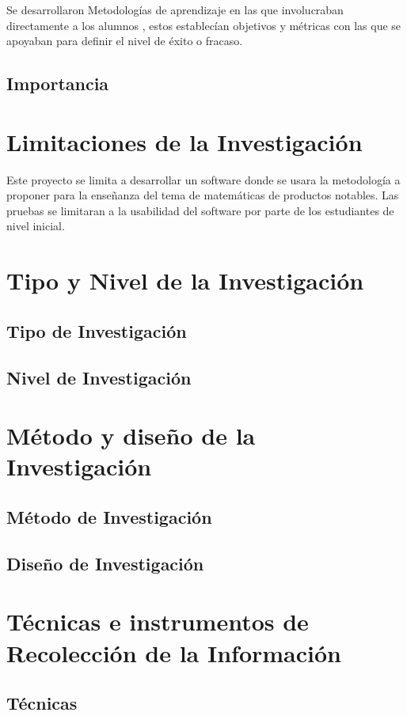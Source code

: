     Se desarrollaron Metodologías de aprendizaje en las que involucraban directamente a los alumnos \cite{Villagrasa2013}, estos establecían objetivos y métricas con las que se apoyaban para definir el nivel de éxito o fracaso.

    \subsection{Importancia}


\section{Limitaciones de la Investigación}
Este proyecto se limita a desarrollar un software donde se usara la metodología a proponer para la enseñanza del tema de matemáticas de productos notables. Las pruebas se limitaran a la usabilidad del software por parte de los estudiantes de nivel inicial.

\section{Tipo y Nivel de la Investigación}
\subsection{Tipo de Investigación}
\subsection{Nivel de Investigación}

\section{Método y diseño de la Investigación}
\subsection{Método de Investigación}
\subsection{Diseño de Investigación}

\section{Técnicas e instrumentos de Recolección de la Información}
\subsection{Técnicas}
